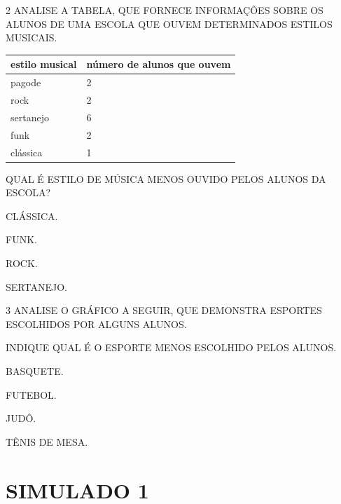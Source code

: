 \num{2} ANALISE A TABELA, QUE FORNECE INFORMAÇÕES SOBRE OS ALUNOS DE UMA ESCOLA QUE OUVEM DETERMINADOS ESTILOS MUSICAIS.

\begin{longtable}[]{@{}ll@{}}
\toprule
estilo musical & número de alunos que ouvem\tabularnewline
\midrule
\endhead
pagode & 2\tabularnewline
rock & 2\tabularnewline
sertanejo & 6\tabularnewline
funk & 2\tabularnewline
clássica & 1\tabularnewline
\bottomrule
\end{longtable}

QUAL É ESTILO DE MÚSICA MENOS OUVIDO PELOS ALUNOS DA ESCOLA?

\begin{escolha}
\item CLÁSSICA.

\item FUNK.

\item ROCK.

\item SERTANEJO.
\end{escolha}



\num{3} ANALISE O GRÁFICO A SEGUIR, QUE DEMONSTRA ESPORTES ESCOLHIDOS POR ALGUNS ALUNOS.


INDIQUE QUAL É O ESPORTE MENOS ESCOLHIDO PELOS ALUNOS.

\begin{escolha}
\item BASQUETE.

\item FUTEBOL.

\item JUDÔ.

\item TÊNIS DE MESA.
\end{escolha}


\chapter{SIMULADO 1}

